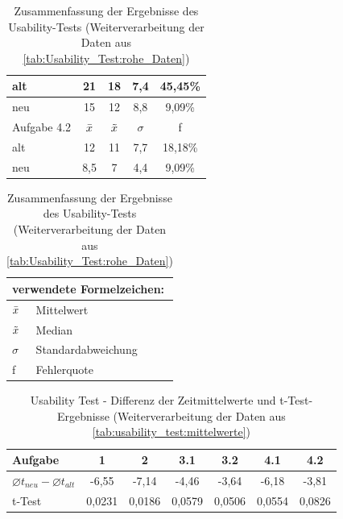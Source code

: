 \begin{table}[H]
\begin{tabular}{|l|c|c|c|c|}
alt           & 21        &  18         &  7,4  &  45,45\%   \\ \hline
neu           & 15        &  12         &  8,8  &  9,09\%   \\ \hline
\hline
Aufgabe 4.2   & $\Bar{x}$ & $\Tilde{x}$ & $\sigma$ & f \\ \hline
alt           & 12        &  11         &  7,7  &  18,18\%   \\ \hline
neu           & 8,5       &  7          &  4,4  &  9,09\%   \\ \hline
\end{tabular}

\begin{tabular}{ll}
\multicolumn{2}{l}{verwendete Formelzeichen:} \\ \hline
$\Bar{x}$          & Mittelwert               \\
$\Tilde{x}$        & Median                   \\
$\sigma$           & Standardabweichung       \\
f                  & Fehlerquote
\end{tabular}
\caption{Zusammenfassung der Ergebnisse des Usability-Tests (Weiterverarbeitung der Daten aus \autoref{tab:Usability_Test:rohe_Daten})}
\label{tab:usability_test:mittelwerte}
\end{table}


\begin{table}[H]
    \centering
    \begin{tabular}{|l|c|c|c|c|c|c|}
    \hline
    Aufgabe                                     & 1     & 2     & 3.1   & 3.2     & 4.1   & 4.2 \\ \hline
    $\varnothing t_{neu} - \varnothing t_{alt}$ & -6,55 & -7,14 & -4,46 & -3,64 & -6,18 & -3,81 \\ \hline
    t-Test                                      & 0,0231& 0,0186& 0,0579& 0,0506& 0,0554& 0,0826\\ \hline
    \end{tabular}
    
    \caption{Usability Test - Differenz der Zeitmittelwerte und t-Test-Ergebnisse (Weiterverarbeitung der Daten aus \autoref{tab:usability_test:mittelwerte})}
    \label{tab:usability_test:Differenz+ttest_Zeit}
\end{table}

